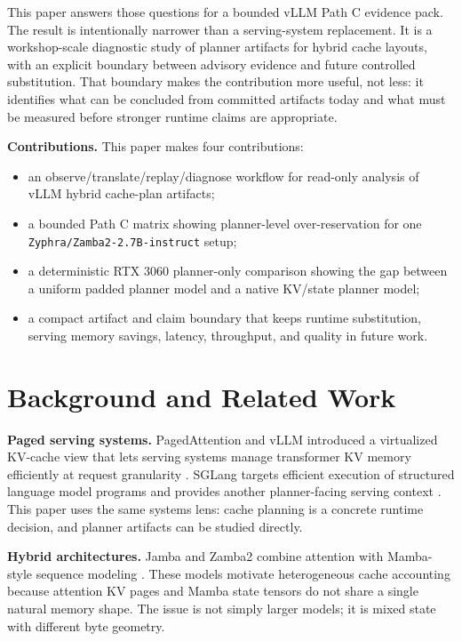 \documentclass[10pt,twocolumn]{article}
\newcommand{\pathc}{Path C}
\newcommand{\plannerpad}{uniform padded}
\newcommand{\plannernative}{native KV/state}
\begin{document}
This paper answers those questions for a bounded vLLM \pathc{} evidence pack.
The result is intentionally narrower than a serving-system replacement. It is
a workshop-scale diagnostic study of planner artifacts for hybrid cache
layouts, with an explicit boundary between advisory evidence and future
controlled substitution. That boundary makes the contribution more useful, not
less: it identifies what can be concluded from committed artifacts today and
what must be measured before stronger runtime claims are appropriate.

\textbf{Contributions.}
This paper makes four contributions:

\begin{itemize}
\item an observe/translate/replay/diagnose workflow for read-only analysis of
vLLM hybrid cache-plan artifacts;
\item a bounded \pathc{} matrix showing planner-level over-reservation for one
\texttt{Zyphra/Zamba2-2.7B-instruct} setup;
\item a deterministic RTX 3060 planner-only comparison showing the gap between
a \plannerpad{} planner model and a \plannernative{} planner model;
\item a compact artifact and claim boundary that keeps runtime substitution,
serving memory savings, latency, throughput, and quality in future work.
\end{itemize}

\section{Background and Related Work}

\textbf{Paged serving systems.}
PagedAttention and vLLM introduced a virtualized KV-cache view that lets
serving systems manage transformer KV memory efficiently at request granularity
\cite{kwon2023pagedattention}. SGLang targets efficient execution of structured
language model programs and provides another planner-facing serving context
\cite{zheng2024sglang}. This paper uses the same systems lens: cache planning
is a concrete runtime decision, and planner artifacts can be studied directly.

\textbf{Hybrid architectures.}
Jamba and Zamba2 combine attention with Mamba-style sequence modeling
\cite{lieber2024jamba,glorioso2024zamba2}. These models motivate heterogeneous
cache accounting because attention KV pages and Mamba state tensors do not
share a single natural memory shape. The issue is not simply larger models; it
is mixed state with different byte geometry.
\end{document}

